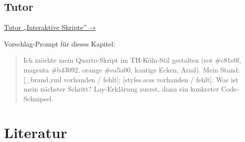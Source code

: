 \documentclass[
  ngerman,
  a4paper,
  DIV=11]{scrreprt}
\begin{document}
\section{Tutor}\label{tutor-3}

\begin{tcolorbox}[enhanced jigsaw, opacitybacktitle=0.6, leftrule=.75mm, title=\textcolor{quarto-callout-tip-color}{\faLightbulb}\hspace{0.5em}{Tutor öffnen}, colframe=quarto-callout-tip-color-frame, arc=.35mm, toprule=.15mm, colbacktitle=quarto-callout-tip-color!10!white, bottomrule=.15mm, colback=white, rightrule=.15mm, breakable, toptitle=1mm, bottomtitle=1mm, opacityback=0, titlerule=0mm, coltitle=black, left=2mm]

\href{https://chatgpt.com/g/g-69fec93348108191af1ffb8ce0cf6712-tutor-interaktive-skripte}{Tutor
„Interaktive Skripte'' →}

Vorschlag-Prompt für dieses Kapitel:

\begin{quote}
Ich möchte mein Quarto-Skript im TH-Köln-Stil gestalten (rot \#c81e0f,
magenta \#b43092, orange \#ea5a00, kantige Ecken, Arial). Mein Stand:
{[}\_brand.yml vorhanden / fehlt{]}; {[}styles.scss vorhanden /
fehlt{]}. Was ist mein nächster Schritt? Lay-Erklärung zuerst, dann ein
konkreter Code-Schnipsel.
\end{quote}

\end{tcolorbox}

\chapter*{Literatur}\label{literatur-3}

\end{document}
